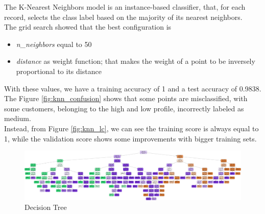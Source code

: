 The K-Nearest Neighbors model is an instance-based classifier, that, for each record, selects the class label based on the majority of its nearest neighbors.\\
The grid search showed that the best configuration is
\begin{itemize}
\item \emph{n\_neighbors} equal to 50
\item \emph{distance} as weight function; that makes the weight of a point to be inversely proportional to its distance
\end{itemize}

With these values, we have a training accuracy of 1 and a test accuracy of 0.9838.
The Figure \ref{fig:knn_confusion} shows that some points are misclassified, with some customers, belonging to the high and low profile, incorrectly labeled as medium.\\
Instead, from Figure \ref{fig:knn_lc}, we can see the training score is always equal to 1, while the validation score shows some improvements with bigger training sets.

\vspace{13mm}
\begin{figure}
\centering
\includegraphics[width=\linewidth]{img/classification/decision_tree.png}
\caption{Decision Tree}
\label{fig:decision_tree}
\end{figure}

\pagebreak

